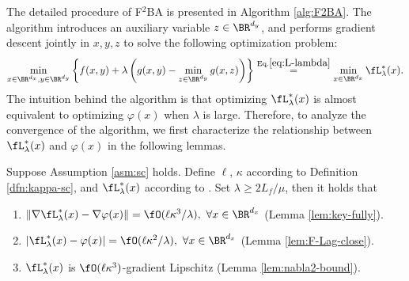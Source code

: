 \documentclass{article}
\begin{document}
The detailed procedure of F${}^2$BA is presented in Algorithm \ref{alg:F2BA}.  
The algorithm introduces an auxiliary variable $z \in \BR^{d_y}$, and performs gradient descent jointly in $x,y,z$ to solve the following optimization problem:
\begin{align}  \label{eq:opt-xyz}
     \min_{x \in \BR^{d_x}, y \in \BR^{d_y}} \left\{f(x,y) + \lambda \left(g(x,y) - \min_{z \in \BR^{d_y}} g(x,z)\right)\right\} \overset{\rm Eq. \ref{eq:L-lambda}}{=} \min_{x \in \BR^{d_x}} \fL_{\lambda}^*(x).
\end{align}
The intuition behind the algorithm is that optimizing $\fL_{\lambda}^*(x)$ is almost equivalent to optimizing $\varphi(x)$ when $\lambda$ is large.
Therefore, to analyze the convergence of the algorithm, we first characterize the relationship between 
$\fL_{\lambda}^*(x)$ and $\varphi(x)$ in the following lemmas.
 
 

\begin{lem} \label{lem:1st}
Suppose Assumption \ref{asm:sc} holds. Define $\ell$,  $\kappa$ according to Definition \ref{dfn:kappa-sc}, and $\fL_{\lambda}^*(x)$ according to . Set $\lambda \ge 2L_f /\mu $, then it holds that 
\begin{enumerate}[label=\alph*.]
    \item $\Vert \nabla \fL_{\lambda}^*(x) - \nabla \varphi(x) \Vert = \fO(\ell \kappa^3 /\lambda),~\forall x \in \BR^{d_x}$ {\rm (Lemma \ref{lem:key-fully})}.
    \item $\vert \fL_{\lambda}^*(x) - \varphi(x) \vert =\fO(\ell \kappa^2/ \lambda),~\forall x \in \BR^{d_x}$ {\rm (Lemma \ref{lem:F-Lag-close})}.
    \item $\fL_{\lambda}^*(x) $ is $\fO(\ell \kappa^3)$-gradient Lipschitz {\rm (Lemma \ref{lem:nabla2-bound})}.
\end{enumerate}
\end{lem}
\end{document}
